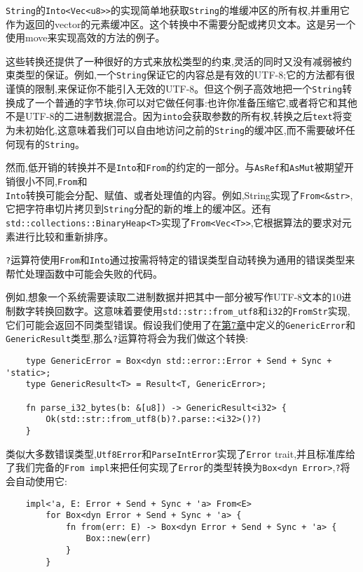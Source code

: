\texttt{String}的\texttt{Into<Vec<u8>>}的实现简单地获取\texttt{String}的堆缓冲区的所有权,并重用它作为返回的vector的元素缓冲区。这个转换中不需要分配或拷贝文本。这是另一个使用move来实现高效的方法的例子。

这些转换还提供了一种很好的方式来放松类型的约束,灵活的同时又没有减弱被约束类型的保证。例如,一个\texttt{String}保证它的内容总是有效的UTF-8;它的方法都有很谨慎的限制,来保证你不能引入无效的UTF-8。但这个例子高效地把一个\texttt{String}转换成了一个普通的字节块,你可以对它做任何事:也许你准备压缩它,或者将它和其他不是UTF-8的二进制数据混合。因为\texttt{into}会获取参数的所有权,转换之后\texttt{text}将变为未初始化,这意味着我们可以自由地访问之前的\texttt{String}的缓冲区,而不需要破坏任何现有的\texttt{String}。

然而,低开销的转换并不是\texttt{Into}和\texttt{From}的约定的一部分。与\texttt{AsRef}和\texttt{AsMut}被期望开销很小不同,\texttt{From}和\\
\texttt{Into}转换可能会分配、赋值、或者处理值的内容。例如,String实现了\texttt{From<\&str>},它把字符串切片拷贝到\texttt{String}分配的新的堆上的缓冲区。还有\texttt{std::collections::BinaryHeap<T>}实现了\texttt{From<Vec<T>>},它根据算法的要求对元素进行比较和重新排序。

\texttt{?}运算符使用\texttt{From}和\texttt{Into}通过按需将特定的错误类型自动转换为通用的错误类型来帮忙处理函数中可能会失败的代码。

例如,想象一个系统需要读取二进制数据并把其中一部分被写作UTF-8文本的10进制数字转换回数字。这意味着要使用\texttt{std::str::from\_utf8}和\texttt{i32}的\texttt{FromStr}实现,它们可能会返回不同类型错误。假设我们使用了在\hyperref[ch07]{第7章}中定义的\texttt{GenericError}和\texttt{GenericResult}类型,那么\texttt{?}运算符将会为我们做这个转换:
\begin{verbatim}
    type GenericError = Box<dyn std::error::Error + Send + Sync + 'static>;
    type GenericResult<T> = Result<T, GenericError>;

    fn parse_i32_bytes(b: &[u8]) -> GenericResult<i32> {
        Ok(std::str::from_utf8(b)?.parse::<i32>()?)
    }
\end{verbatim}

类似大多数错误类型,\texttt{Utf8Error}和\texttt{ParseIntError}实现了\texttt{Error} trait,并且标准库给了我们完备的\texttt{From impl}来把任何实现了\texttt{Error}的类型转换为\texttt{Box<dyn Error>},\texttt{?}将会自动使用它:
\begin{verbatim}
    impl<'a, E: Error + Send + Sync + 'a> From<E>
        for Box<dyn Error + Send + Sync + 'a> {
            fn from(err: E) -> Box<dyn Error + Send + Sync + 'a> {
                Box::new(err)
            }
        }
\end{verbatim}


